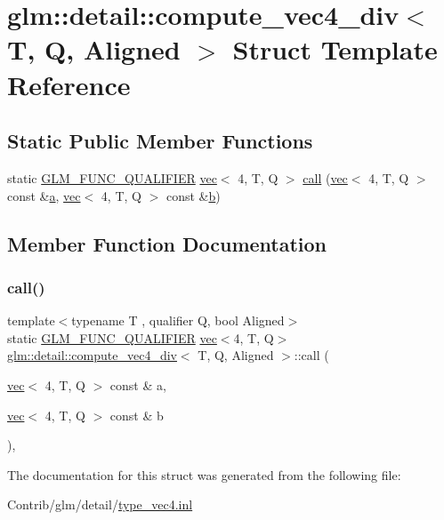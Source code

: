 \hypertarget{structglm_1_1detail_1_1compute__vec4__div}{}\section{glm\+:\+:detail\+:\+:compute\+\_\+vec4\+\_\+div$<$ T, Q, Aligned $>$ Struct Template Reference}
\label{structglm_1_1detail_1_1compute__vec4__div}
\subsection*{Static Public Member Functions}
\begin{DoxyCompactItemize}
\item 
static \mbox{\hyperlink{setup_8hpp_a33fdea6f91c5f834105f7415e2a64407}{G\+L\+M\+\_\+\+F\+U\+N\+C\+\_\+\+Q\+U\+A\+L\+I\+F\+I\+ER}} \mbox{\hyperlink{structglm_1_1vec}{vec}}$<$ 4, T, Q $>$ \mbox{\hyperlink{structglm_1_1detail_1_1compute__vec4__div_aa509cf7a53575bad020952593cf592d3}{call}} (\mbox{\hyperlink{structglm_1_1vec}{vec}}$<$ 4, T, Q $>$ const \&\mbox{\hyperlink{_s_d_l__opengl__glext_8h_a3309789fc188587d666cda5ece79cf82}{a}}, \mbox{\hyperlink{structglm_1_1vec}{vec}}$<$ 4, T, Q $>$ const \&\mbox{\hyperlink{_s_d_l__opengl__glext_8h_a0f71581a41fd2264c8944126dabbd010}{b}})
\end{DoxyCompactItemize}


\subsection{Member Function Documentation}
\mbox{\label{structglm_1_1detail_1_1compute__vec4__div_aa509cf7a53575bad020952593cf592d3}} 
\subsubsection{\texorpdfstring{call()}{call()}}
{\footnotesize\ttfamily template$<$typename T , qualifier Q, bool Aligned$>$ \\
static \mbox{\hyperlink{setup_8hpp_a33fdea6f91c5f834105f7415e2a64407}{G\+L\+M\+\_\+\+F\+U\+N\+C\+\_\+\+Q\+U\+A\+L\+I\+F\+I\+ER}} \mbox{\hyperlink{structglm_1_1vec}{vec}}$<$4, T, Q$>$ \mbox{\hyperlink{structglm_1_1detail_1_1compute__vec4__div}{glm\+::detail\+::compute\+\_\+vec4\+\_\+div}}$<$ T, Q, Aligned $>$\+::call (\begin{DoxyParamCaption}\item[{\mbox{\hyperlink{structglm_1_1vec}{vec}}$<$ 4, T, Q $>$ const \&}]{a,  }\item[{\mbox{\hyperlink{structglm_1_1vec}{vec}}$<$ 4, T, Q $>$ const \&}]{b }\end{DoxyParamCaption})\hspace{0.3cm}{\ttfamily [inline]}, {\ttfamily [static]}}



The documentation for this struct was generated from the following file\+:\begin{DoxyCompactItemize}
\item 
Contrib/glm/detail/\mbox{\hyperlink{type__vec4_8inl}{type\+\_\+vec4.\+inl}}\end{DoxyCompactItemize}
